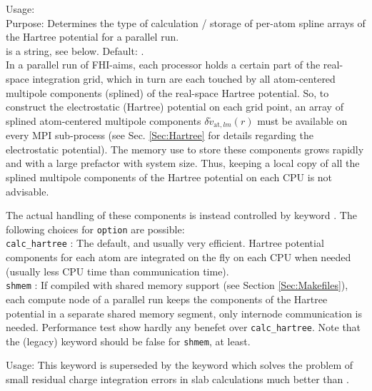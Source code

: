 {
  \noindent
  Usage:   \\[1.0ex]
  Purpose: Determines the type of calculation / storage of
    per-atom spline arrays of the Hartree potential for a parallel
  run. \\[1.0ex] 
   is a string, see below. Default:  . \\
}
In a parallel run of FHI-aims, each processor holds a certain part of the
real-space integration grid, which in turn are each touched by all
atom-centered multipole components (splined) of the real-space Hartree
potential. So, to construct the electrostatic (Hartree) potential on each grid
point, an array of splined atom-centered multipole components
$\delta\tilde{v}_{\text{at},lm}(r)$ must be available on every MPI sub-process
(see Sec. \ref{Sec:Hartree} for details regarding the electrostatic
potential). The memory use to store these components grows rapidly and with a
large prefactor with system size. Thus, keeping a local copy of all the
splined multipole components of the Hartree potential on each CPU is not
advisable.

The actual handling of these components is instead controlled
by keyword . The following choices for
  \texttt{option} are possible: \\
\texttt{calc\_hartree} : The default, and usually very efficient. Hartree
  potential components for each atom are integrated on the fly on each CPU when
  needed (usually less CPU time than communication time). \\
\texttt{shmem} : If compiled with shared memory support (see Section
  \ref{Sec:Makefiles}), each compute node of a parallel run keeps the
  components of the Hartree potential in a separate shared memory segment,
  only internode communication is needed.  Performance test show hardly any
  benefet over \texttt{calc\_hartree}.
Note that the (legacy) keyword  should
be false for \texttt{shmem}, at least.

{
	\noindent
	Usage:  
}
This keyword is superseded by the  keyword which
solves the problem of small residual charge integration errors in slab calculations much
better than  .

